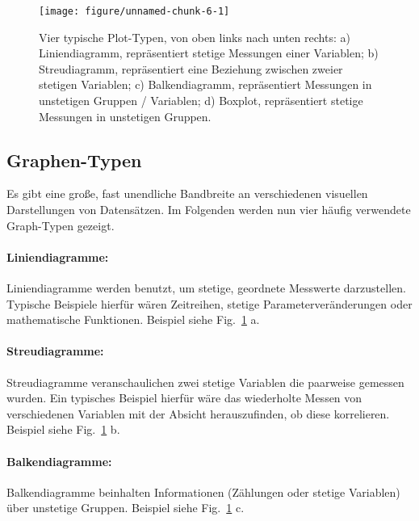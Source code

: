 \documentclass[a4paper,twoside]{tufte-book}\usepackage[]{graphicx}\usepackage[]{color}
\begin{document}
\begin{figure}[htbp]
\begin{center}

\begin{Schunk}

\texttt{[image: figure/unnamed-chunk-6-1]} \end{Schunk}
\caption{Vier typische Plot-Typen, von oben links nach unten rechts: a) Liniendiagramm, repräsentiert stetige Messungen einer Variablen; b) Streudiagramm, repräsentiert eine Beziehung zwischen zweier stetigen Variablen; c) Balkendiagramm, repräsentiert Messungen in unstetigen Gruppen / Variablen; d) Boxplot, repräsentiert stetige Messungen in unstetigen Gruppen.}
\label{fig: exaple plots}
\end{center}
\end{figure}


\subsection{Graphen-Typen}

Es gibt eine große, fast unendliche Bandbreite an verschiedenen visuellen Darstellungen von Datensätzen. Im Folgenden werden nun vier häufig verwendete Graph-Typen gezeigt. 

\paragraph{Liniendiagramme:} Liniendiagramme werden benutzt, um stetige, geordnete Messwerte darzustellen. Typische Beispiele hierfür wären Zeitreihen, stetige Parameterveränderungen oder mathematische Funktionen. Beispiel siehe Fig.~\ref{fig: exaple plots} a.

\paragraph{Streudiagramme:} Streudiagramme veranschaulichen zwei stetige Variablen die paarweise gemessen wurden. Ein typisches Beispiel hierfür wäre das wiederholte Messen von verschiedenen Variablen mit der Absicht herauszufinden, ob diese korrelieren. Beispiel siehe Fig.~\ref{fig: exaple plots} b.

\paragraph{Balkendiagramme:} Balkendiagramme beinhalten Informationen (Zählungen oder stetige Variablen) über unstetige Gruppen. Beispiel siehe Fig.~\ref{fig: exaple plots} c.
\end{document}
